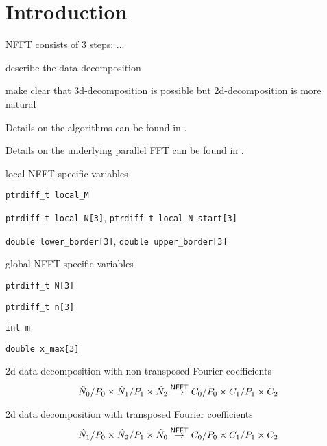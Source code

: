 \section{Introduction}

\begin{compactitem}
  \item NFFT consists of 3 steps: ...
  \item describe the data decomposition
  \item make clear that 3d-decomposition is possible but 2d-decomposition is more natural
\end{compactitem}
\begin{compactitem}
  \item Details on the algorithms can be found in \cite{PiPo12}.
  \item Details on the underlying parallel FFT can be found in \cite{Pi12}.
\end{compactitem}

local NFFT specific variables
\begin{compactitem}
  \item \verb+ptrdiff_t local_M+
  \item \verb+ptrdiff_t local_N[3]+, \verb+ptrdiff_t local_N_start[3]+
  \item \verb+double lower_border[3]+, \verb+double upper_border[3]+
\end{compactitem}

global NFFT specific variables
\begin{compactitem}
  \item \verb+ptrdiff_t N[3]+
  \item \verb+ptrdiff_t n[3]+
  \item \verb+int m+
  \item \verb+double x_max[3]+
\end{compactitem}



2d data decomposition with non-transposed Fourier coefficients
\begin{equation*}
  \hat N_0 / P_0 \times \hat N_1 / P_1 \times \hat N_2
  \overset{\textsf{\textsf{NFFT}}}{\rightarrow}
  C_0 / P_0 \times C_1 / P_1 \times C_2
\end{equation*}

2d data decomposition with transposed Fourier coefficients
\begin{equation*}
  \hat N_1 / P_0 \times \hat N_2 / P_1 \times \hat N_0
  \overset{\textsf{\textsf{NFFT}}}{\rightarrow}
  C_0 / P_0 \times C_1 / P_1 \times C_2
\end{equation*}

